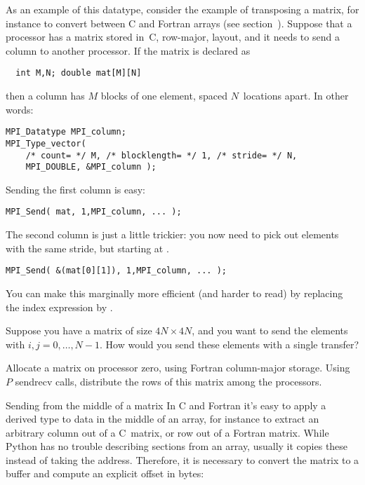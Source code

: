 As an example of this datatype, consider the example of transposing
a matrix, for instance to convert between
C and Fortran arrays (see section~). Suppose that 
a processor has a matrix stored in~C, row-major, layout, and it needs
to send a column to another processor. If the matrix is declared as
\begin{lstlisting}
  int M,N; double mat[M][N]
\end{lstlisting}
then a column has $M$ blocks of one element, spaced $N$~locations apart.
In other words:
\begin{lstlisting}
MPI_Datatype MPI_column;
MPI_Type_vector( 
    /* count= */ M, /* blocklength= */ 1, /* stride= */ N,
    MPI_DOUBLE, &MPI_column );
\end{lstlisting}
Sending the first column is easy:
\begin{lstlisting}
MPI_Send( mat, 1,MPI_column, ... );
\end{lstlisting}
The second column is just a little trickier: you now need to pick out 
elements with the same stride, but starting at .
\begin{lstlisting}
MPI_Send( &(mat[0][1]), 1,MPI_column, ... );
\end{lstlisting}
You can make this marginally more efficient (and harder to read)
by replacing the index expression by .

\begin{exercise}
  Suppose you have a matrix of size $4N\times 4N$, and you want to
  send the elements  with $i,j=0,\ldots,N-1$. How would
  you send these elements with a single transfer?
\end{exercise}

\begin{exercise}
  \label{ex:col-to-row}
  Allocate a matrix on processor zero, using Fortran column-major storage.
  Using $P$ sendrecv calls, distribute the rows of this matrix among the
  processors.
\end{exercise}

\begin{pythonnote}{Sending from the middle of a matrix}
  In C and Fortran it's easy to apply a derived type
  to data in the middle of an array,
  for instance to extract an arbitrary column out of a C~matrix,
  or row out of a Fortran matrix.
  While Python has no trouble describing sections from an array,
  usually it copies these instead of taking the address.
  Therefore, it is necessary to convert the matrix
  to a buffer and compute an explicit offset in bytes:
\end{pythonnote}

